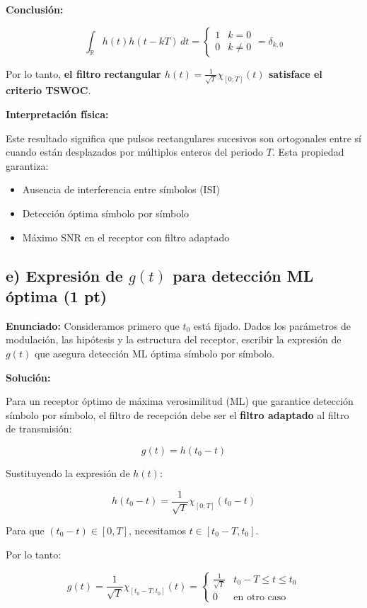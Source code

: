 \documentclass[11pt,a4paper]{article}
\begin{document}
\textbf{Conclusi\'on:}

\[
\boxed{\int_{\mathbb{R}} h(t) h(t - kT)\, dt = \begin{cases}
1 & k = 0 \\
0 & k \neq 0
\end{cases} = \delta_{k,0}}
\]

Por lo tanto, \textbf{el filtro rectangular $h(t) = \frac{1}{\sqrt{T}}\chi_{[0;T]}(t)$ satisface el criterio TSWOC}.

\textbf{Interpretaci\'on f\'isica:}

Este resultado significa que pulsos rectangulares sucesivos son ortogonales entre s\'i cuando est\'an desplazados por m\'ultiplos enteros del periodo $T$. Esta propiedad garantiza:
\begin{itemize}
    \item Ausencia de interferencia entre s\'imbolos (ISI)
    \item Detecci\'on \'optima s\'imbolo por s\'imbolo
    \item M\'aximo SNR en el receptor con filtro adaptado
\end{itemize}



\subsection*{e) Expresi\'on de $g(t)$ para detecci\'on ML \'optima (1 pt)}

\textbf{Enunciado:} Consideramos primero que $t_0$ est\'a fijado. Dados los par\'ametros de modulaci\'on, las hip\'otesis y la estructura del receptor, escribir la expresi\'on de $g(t)$ que asegura detecci\'on ML \'optima s\'imbolo por s\'imbolo.

\vspace{0.3cm}
\textbf{Soluci\'on:}

Para un receptor \'optimo de m\'axima verosimilitud (ML) que garantice detecci\'on s\'imbolo por s\'imbolo, el filtro de recepci\'on debe ser el \textbf{filtro adaptado} al filtro de transmisi\'on:

\[
\boxed{g(t) = h(t_0 - t)}
\]

Sustituyendo la expresi\'on de $h(t)$:

\[
h(t_0 - t) = \frac{1}{\sqrt{T}} \chi_{[0;T]}(t_0 - t)
\]

Para que $(t_0 - t) \in [0, T]$, necesitamos $t \in [t_0 - T, t_0]$.

Por lo tanto:

\[
\boxed{g(t) = \frac{1}{\sqrt{T}} \chi_{[t_0-T; t_0]}(t) = \begin{cases}
\frac{1}{\sqrt{T}} & t_0 - T \leq t \leq t_0 \\
0 & \text{en otro caso}
\end{cases}}
\]
\end{document}

